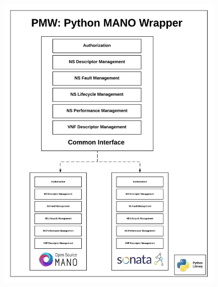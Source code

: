 \begin{figure}
	\centering
	\includegraphics[width=1\linewidth]{figures/WrapperArch}
	\caption{}
	\label{fig:wrapperarch}
\end{figure}
